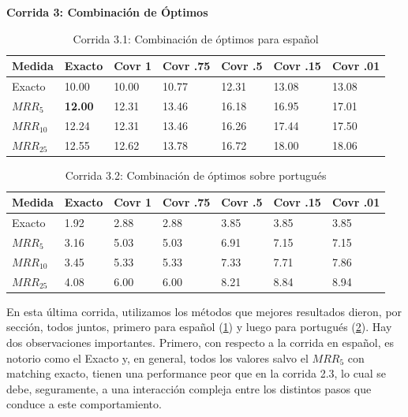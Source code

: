 \medskip
\textbf{Corrida 3: Combinación de Óptimos}\newline




\begin{table}
\centering
\begin{center}
\begin{tabular}{|l | l | l | l | l | l | l |}
\hline
Medida & Exacto & Covr 1 & Covr .75 & Covr .5 & Covr .15 & Covr .01 \\ \hline
Exacto & 10.00 & 10.00 & 10.77 & 12.31 & 13.08 & 13.08  \\ \hline
$MRR_{5}$ & \textbf{12.00} & 12.31 & 13.46 & 16.18 & 16.95 & 17.01  \\ \hline
$MRR_{10}$ & 12.24 & 12.31 & 13.46 & 16.26 & 17.44 & 17.50  \\ \hline
$MRR_{25}$ & 12.55 & 12.62 & 13.78 & 16.72 & 18.00 & 18.06  \\ \hline
\end{tabular}
\medskip
\caption{Corrida 3.1: Combinación de óptimos para español}
\label{table:optimos}
\end{center}
\end{table}

\begin{table}
\centering
\begin{center}
\begin{tabular}{|l | l | l | l | l | l | l |}
\hline
Medida & Exacto & Covr 1 & Covr .75 & Covr .5 & Covr .15 & Covr .01 \\ \hline
Exacto & 1.92 & 2.88 & 2.88 & 3.85 & 3.85 & 3.85  \\ \hline
$MRR_{5}$ & 3.16 & 5.03 & 5.03 & 6.91 & 7.15 & 7.15  \\ \hline
$MRR_{10}$ & 3.45 & 5.33 & 5.33 & 7.33 & 7.71 & 7.86  \\ \hline
$MRR_{25}$ & 4.08 & 6.00 & 6.00 & 8.21 & 8.84 & 8.94  \\ \hline
\end{tabular}
\caption{Corrida 3.2: Combinación de óptimos sobre portugués}
\label{table:2_3_2_40_getExactMRRWikiFactoid_getCovrMRRWikiFactoid}
\end{center}
\end{table}


En esta última corrida, utilizamos los métodos que mejores resultados dieron, por sección, todos juntos, primero para español (\ref{table:optimos}) y luego para portugués (\ref{table:2_3_2_40_getExactMRRWikiFactoid_getCovrMRRWikiFactoid}).
Hay dos observaciones importantes. Primero, con respecto a la corrida en español, es notorio como el Exacto y, en general, todos los valores salvo el $MRR_5$ con matching exacto, tienen una performance peor que en la corrida 2.3, lo cual se debe, seguramente, a una interacción compleja entre los distintos pasos que conduce a este comportamiento.


